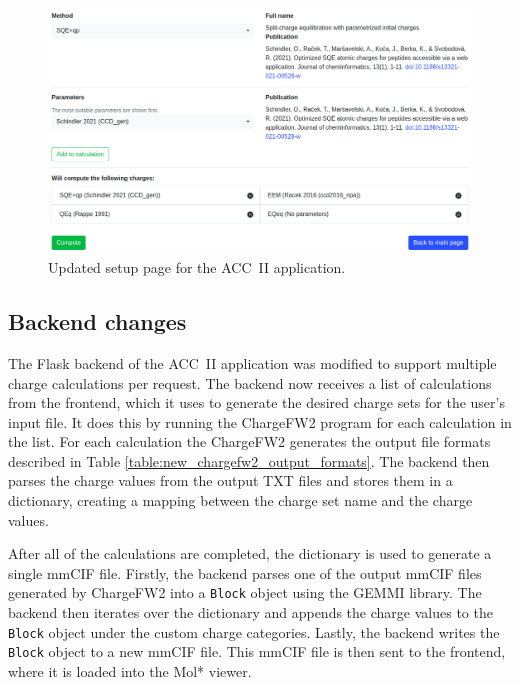 \documentclass[
  digital,     %
  oneside,     %
  nosansbold,  %
  nocolorbold, %
  lof,         %
  lot,         %
]{fithesis4}
\begin{document}
\begin{figure}[htbp]
  \begin{center}
    \includegraphics[width=\textwidth]{figures/new_setup.png}
  \end{center}
  \caption{Updated setup page for the ACC~II application.}
  \label{fig:new_setup}
\end{figure}

\subsection{Backend changes}

The Flask backend of the ACC~II application was modified to support multiple charge calculations per request. The backend now receives a list of calculations from the frontend, which it uses to generate the desired charge sets for the user's input file. It does this by running the ChargeFW2 program for each calculation in the list. For each calculation the ChargeFW2 generates the output file formats described in Table \ref{table:new_chargefw2_output_formats}. The backend then parses the charge values from the output TXT files and stores them in a dictionary, creating a mapping between the charge set name and the charge values.

After all of the calculations are completed, the dictionary is used to generate a single mmCIF file. Firstly, the backend parses one of the output mmCIF files generated by ChargeFW2 into a \texttt{Block} object using the GEMMI library. The backend then iterates over the dictionary and appends the charge values to the \texttt{Block} object under the custom charge categories. Lastly, the backend writes the \texttt{Block} object to a new mmCIF file. This mmCIF file is then sent to the frontend, where it is loaded into the Mol* viewer.
\end{document}

